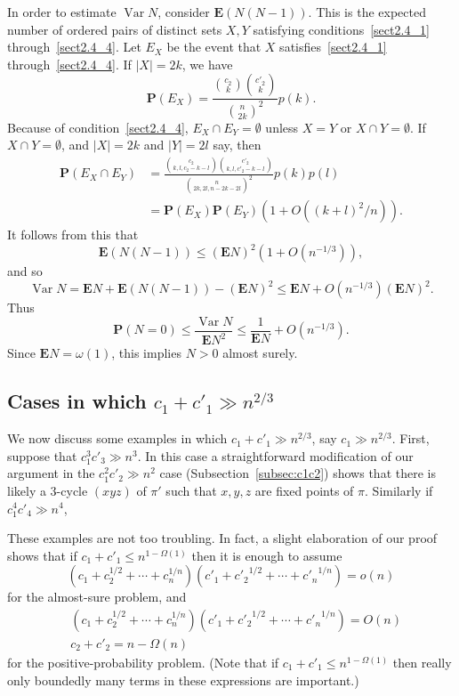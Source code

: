 \documentclass[ALCO,ThmDefs,Unicode,epreuves]{cedram}
\DeclareMathOperator{\Var}{Var}
\renewcommand\P{\mathbf{P}}
\newcommand\E{\mathbf{E}}
\begin{document}
In order to estimate $\Var N$, consider $\E(N(N-1))$. This is the expected number of ordered pairs of distinct sets $X, Y$ satisfying conditions~\eqref{sect2.4_1} through~\eqref{sect2.4_4}. Let $E_X$ be the event that $X$ satisfies~\eqref{sect2.4_1} through~\eqref{sect2.4_4}. If $|X| = 2k$, we have
\[
 \P(E_X) = \frac{\binom{c_2}{k} \binom{c'_2}{k}}{\binom{n}{2k}^2} p(k).
\]
Because of condition~\eqref{sect2.4_4}, $E_X \cap E_Y = \emptyset$ unless $X=Y$ or $X \cap Y = \emptyset$. If $X \cap Y = \emptyset$, and $|X| = 2k$ and $|Y| = 2l$ say, then
\begin{align*}
 \P(E_X \cap E_Y)
 &= \frac{\binom{c_2}{k,l,c_2-k-l} \binom{c'_2}{k,l,c'_2-k-l}}{\binom{n}{2k, 2l, n-2k-2l}^2} p(k) p(l) \\
 &= \P(E_X) \P(E_Y) (1 + O((k+l)^2 / n)).
\end{align*}
It follows from this that
\[
 \E(N(N-1)) \leq (\E N)^2 (1 + O(n^{-1/3})),
\]
and so
\[
 \Var N = \E N + \E(N(N-1)) - (\E N)^2 \leq \E N + O(n^{-1/3}) (\E N)^2.
\]
Thus
\[
 \P(N = 0) \leq \frac{\Var N}{\E N^2} \leq \frac1{\E N} + O(n^{-1/3}).
\]
Since $\E N = \omega(1)$, this implies $N > 0$ almost surely.

\subsection{Cases in which \texorpdfstring{$c_1 + c'_1 \gg n^{2/3}$}{c1 + c1' >> n\textasciicircum{2/3}}}

We now discuss some examples in which $c_1 + c'_1 \gg n^{2/3}$, say $c_1 \gg n^{2/3}$. First, suppose that $c_1^3 c'_3 \gg n^3$. In this case a straightforward modification of our argument in the $c_1^2 c'_2 \gg n^2$ case (Subsection~\ref{subsec:c1c2}) shows that there is likely a $3$-cycle $(xyz)$ of $\pi'$ such that $x,y,z$ are fixed points of $\pi$. Similarly if $c_1^4 c'_4 \gg n^4$, \etc

These examples are not too troubling. In fact, a slight elaboration of our proof shows that if $c_1 + c'_1 \leq n^{1-\Omega(1)}$ then it is enough to assume
\[
 (c_1 + c_2^{1/2} + \cdots + c_n^{1/n})
 (c'_1 + {c'_2}^{1/2} + \cdots + {c'_n}^{1/n}) = o(n)
\]
for the almost-sure problem, and
\begin{align*}
 &(c_1 + c_2^{1/2} + \cdots + c_n^{1/n})
 (c'_1 + {c'_2}^{1/2} + \cdots + {c'_n}^{1/n}) = O(n) \\
 &c_2 + c'_2 = n - \Omega(n)
\end{align*}
for the positive-probability problem. (Note that if $c_1 + c'_1 \leq n^{1-\Omega(1)}$ then really only boundedly many terms in these expressions are important.)
\end{document}
